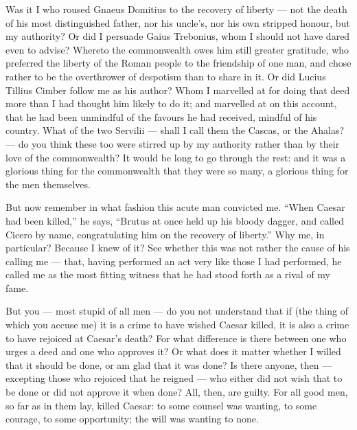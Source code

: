  Was it I who roused Gnaeus Domitius to the recovery of liberty --- not the death of his most distinguished father, nor his uncle's, nor his own stripped honour, but my authority? Or did I persuade Gaius Trebonius, whom I should not have dared even to advise? Whereto the commonwealth owes him still greater gratitude, who preferred the liberty of the Roman people to the friendship of one man, and chose rather to be the overthrower of despotism than to share in it. Or did Lucius Tillius Cimber follow me as his author? Whom I marvelled at for doing that deed more than I had thought him likely to do it; and marvelled at on this account, that he had been unmindful of the favours he had received, mindful of his country. What of the two Servilii --- shall I call them the Cascas, or the Ahalas? --- do you think these too were stirred up by my authority rather than by their love of the commonwealth? It would be long to go through the rest: and it was a glorious thing for the commonwealth that they were so many, a glorious thing for the men themselves.

 But now remember in what fashion this acute man convicted me. ``When Caesar had been killed,'' he says, ``Brutus at once held up his bloody dagger, and called Cicero by name, congratulating him on the recovery of liberty.'' Why me, in particular? Because I knew of it? See whether this was not rather the cause of his calling me --- that, having performed an act very like those I had performed, he called me as the most fitting witness that he had stood forth as a rival of my fame.

 But you --- most stupid of all men --- do you not understand that if (the thing of which you accuse me) it is a crime to have wished Caesar killed, it is also a crime to have rejoiced at Caesar's death? For what difference is there between one who urges a deed and one who approves it? Or what does it matter whether I willed that it should be done, or am glad that it was done? Is there anyone, then --- excepting those who rejoiced that he reigned --- who either did not wish that to be done or did not approve it when done? All, then, are guilty. For all good men, so far as in them lay, killed Caesar: to some counsel was wanting, to some courage, to some opportunity; the will was wanting to none.

